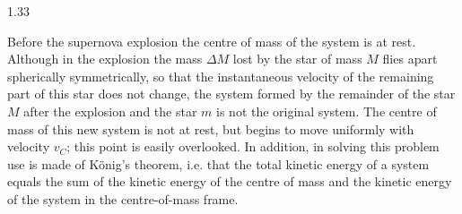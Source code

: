 \begin{solution}{1.33}
\begin{commentary}
Before the supernova explosion the centre of mass of the system is at rest. Although in the explosion the mass $\Delta M$ lost by the star of mass $M$ flies apart spherically symmetrically, so that the instantaneous velocity of the remaining part of this star does not change, the system formed by the remainder of the star $M$ after the explosion and the star $m$ is not the original system. The centre of mass of this new system is not at rest, but begins to move uniformly with velocity $v_C$; this point is easily overlooked. In addition, in solving this problem use is made of K\"onig's theorem, i.e. that the total kinetic energy of a system equals the sum of the kinetic energy of the centre of mass and the kinetic energy of the system in the centre-of-mass frame.
\end{commentary}

\end{solution}

